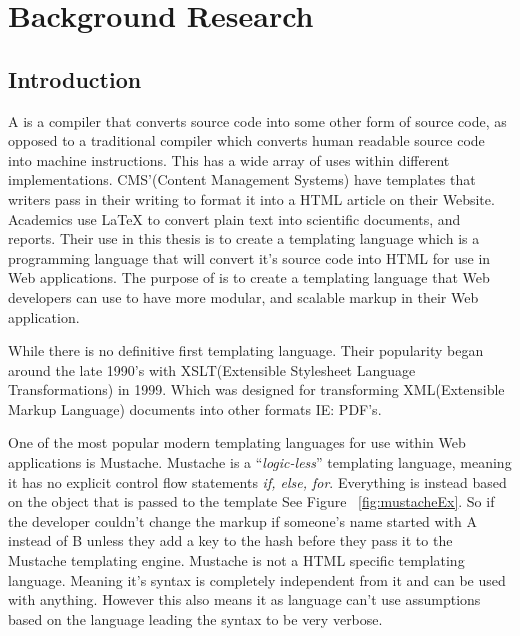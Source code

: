 \chapter{Background Research}
\section{Introduction}

A \compiler{}  is a compiler that converts source code into some other form of source code, as opposed to a traditional compiler which converts human readable source code into machine instructions. This has a wide array of uses within different implementations. CMS'(Content Management Systems) have templates that writers pass in their writing to format it into a HTML article on their Website. Academics use \LaTeX{} to convert plain text into scientific documents, and reports. Their use in this thesis is to create a templating language which is a programming language that will convert it's source code into HTML for use in Web applications. The purpose of \languageName{} is to create a templating language that Web developers can use to have more modular, and scalable markup in their Web application.

While there is no definitive first templating language. Their popularity began around the late 1990's with XSLT(Extensible Stylesheet Language Transformations) in 1999\cite{XSLT}. Which was designed for transforming XML(Extensible Markup Language) documents into other formats IE: PDF's\cite{XSLTEx}.
\newpage 

One of the most popular modern templating languages for use within Web applications is Mustache\cite{Mustache}. Mustache is a ``\textit{logic-less}'' templating language, meaning it has no explicit control flow statements \textit{if, else, for}\cite{MustacheMan}. Everything is instead based on the object that is passed to the template See Figure ~\ref{fig:mustacheEx}. So if the developer couldn't change the markup if someone's name started with A instead of B unless they add a key to the hash before they pass it to the Mustache templating engine. Mustache is not a HTML specific templating language. Meaning it's syntax is completely independent from it and can be used with anything. However this also means it as language can't use assumptions based on the language leading the syntax to be very verbose. 

